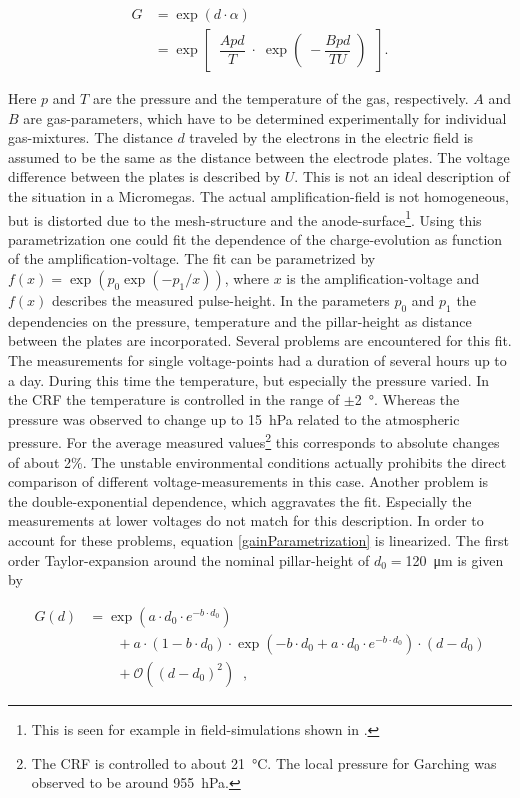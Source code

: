 \documentclass[
twoside,            %
BCOR1.4cm,          %
10pt,               %
headings=normal,    %
headsepline,        %
clearplainpage,		%
final,              %
div=14,
open=right,
bibliography=toc
]{scrreprt}
\begin{document}
\begin{align}
	G &= \exp\left(d \cdot \alpha \right)
	\\[10pt]
	&= \exp\left[ \;\; \dfrac{A p d}{T} \; \cdot \; \exp\!\left(\; -\dfrac{B p d}{T U} \; \right) \;\; \right].
	\label{gainParametrization}
\end{align}

Here $p$ and $T$ are the pressure and the temperature of the gas, respectively.
$A$ and $B$ are gas-parameters, which have to be determined experimentally for individual gas-mixtures.
The distance $d$ traveled by the electrons in the electric field is assumed to be the same as the distance between the electrode plates.
The voltage difference between the plates is described by $U$.
This is not an ideal description of the situation in a Micromegas.
The actual amplification-field is not homogeneous, but is distorted due to the mesh-structure and the anode-surface\footnote{
	This is seen for example in field-simulations shown in \cite{kugerThesis}.
}.
Using this parametrization one could fit the dependence of the charge-evolution as function of the amplification-voltage.
The fit can be parametrized by $f(x) = \exp( p_0 \exp( - p_1 / x ) )$, where $x$ is the amplification-voltage and $f(x)$ describes the measured pulse-height.
In the parameters $p_0$ and $p_1$ the dependencies on the pressure, temperature and the pillar-height as distance between the plates are incorporated.
Several problems are encountered for this fit.
The measurements for single voltage-points had a duration of several hours up to a day.
During this time the temperature, but especially the pressure varied.
In the CRF the temperature is controlled in the range of $\pm$\SI{2}{\degree}.
Whereas the pressure was observed to change up to \SI{15}{hPa} related to the atmospheric pressure.
For the average measured values\footnote{
	The CRF is controlled to about \SI{21}{\celsius}.
	The local pressure for Garching was observed to be around \SI{955}{hPa}.
} this corresponds to absolute changes of about 2\%. 
The unstable environmental conditions actually prohibits the direct comparison of different voltage-measurements in this case.
Another problem is the double-exponential dependence, which aggravates the fit.
Especially the measurements at lower voltages do not match for this description.
In order to account for these problems, equation \ref{gainParametrization} is linearized.
The first order Taylor-expansion around the nominal pillar-height of $d_0 = $\SI{120}{\micro\m} is given by

\begin{align}
	G(d) &= 
			\exp\left( a \cdot d_0 \cdot e^{- b \cdot d_0} \right) 
			\nonumber
			\\
			&\qquad + a \cdot ( 1 - b \cdot d_0 ) \cdot \exp\left( - b \cdot d_0 + a \cdot d_0 \cdot e^{- b \cdot d_0} \right) \cdot ( d - d_0 )
			\nonumber
			\\
			&\qquad + \mathcal{O}\left( ( d - d_0 )^2\right) \;\; ,
\end{align}
\end{document}
